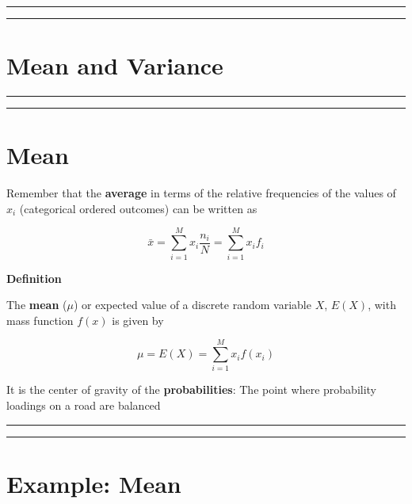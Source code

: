 \documentclass[
]{book}
\begin{document}
\begin{center}\rule{0.5\linewidth}{0.5pt}\end{center}

\begin{center}\rule{0.5\linewidth}{0.5pt}\end{center}

\hypertarget{mean-and-variance-1}{%
\section{Mean and Variance}\label{mean-and-variance-1}}

\begin{center}\rule{0.5\linewidth}{0.5pt}\end{center}

\begin{center}\rule{0.5\linewidth}{0.5pt}\end{center}

\hypertarget{mean}{%
\section{Mean}\label{mean}}

Remember that the \textbf{average} in terms of the relative frequencies of the values of \(x_i\) (categorical ordered outcomes) can be written as

\[\bar{x}= \sum_{i=1}^M x_i \frac{n_i}{N}=\sum_{i=1}^M x_i f_i\]

\textbf{Definition}

The \textbf{mean} (\(\mu\)) or expected value of a discrete random variable \(X\), \(E(X)\), with mass function \(f(x)\) is given by

\[ \mu = E(X)= \sum_{i=1}^M x_i f(x_i) \]

It is the center of gravity of the \textbf{probabilities}: The point where probability loadings on a road are balanced

\begin{center}\rule{0.5\linewidth}{0.5pt}\end{center}

\begin{center}\rule{0.5\linewidth}{0.5pt}\end{center}

\hypertarget{example-mean}{%
\section{Example: Mean}\label{example-mean}}
\end{document}
